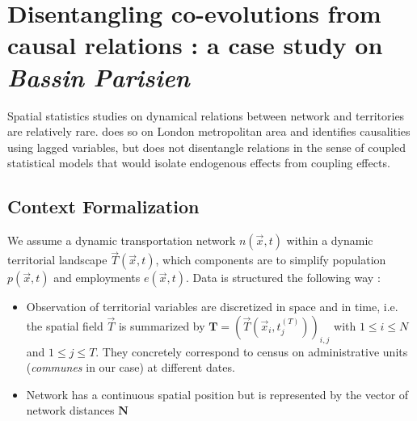 

\newpage

\section[Disentangling co-evolutions from causal relations]{Disentangling co-evolutions from causal relations : a case study on \emph{Bassin Parisien}}

Spatial statistics studies on dynamical relations between network and territories are relatively rare. \cite{levinson2008density} does so on London metropolitan area and identifies causalities using lagged variables, but does not disentangle relations in the sense of coupled statistical models that would isolate endogenous effects from coupling effects.




\subsection{Context Formalization}



We assume a dynamic transportation network $n(\vec{x},t)$ within a dynamic territorial landscape $\vec{T}(\vec{x},t)$, which components are to simplify population $p(\vec{x},t)$ and employments $e(\vec{x},t)$. Data is structured the following way :
\begin{itemize}
\item Observation of territorial variables are discretized in space and in time, i.e. the spatial field $\vec{T}$ is summarized by $\mathbf{T} = \left(\vec{T}(\vec{x}_i,t_j^{(T)})\right)_{i,j}$ with $1\leq i \leq N$ and $1\leq j \leq T$. They concretely correspond to census on administrative units (\emph{communes} in our case) at different dates.
\item Network has a continuous spatial position but is represented by the vector of network distances $\mathbf{N}$
\end{itemize}




